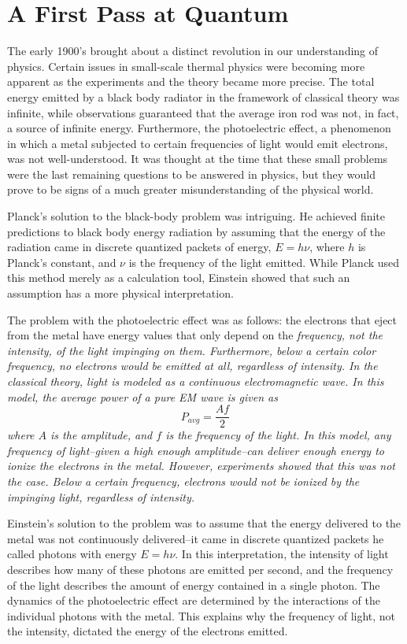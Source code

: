 \section{A First Pass at Quantum}
The early 1900's brought about a distinct revolution in our understanding of
physics. Certain issues in small-scale thermal physics were becoming more
apparent as the experiments and the theory became more precise.  The total
energy emitted by a black body radiator in the framework of classical theory was
infinite, while observations guaranteed that the average iron rod was not, in
fact, a source of infinite energy. Furthermore, the photoelectric effect, a
phenomenon in which a metal subjected to certain frequencies of light would emit
electrons, was not well-understood. It was thought at the time that these small
problems were the last remaining questions to be answered in physics, but they
would prove to be signs of a much greater misunderstanding of the physical
world.

Planck's solution to the black-body problem was intriguing. He achieved finite
predictions to black body energy radiation by assuming that the energy of the
radiation came in discrete quantized packets of energy, $E=h\nu$, where $h$ is
Planck's constant, and $\nu$ is the frequency of the light emitted. While Planck
used this method merely as a calculation tool, Einstein showed that
such an assumption has a more physical interpretation.

The problem with the photoelectric effect was as follows: the electrons that
eject from the metal have energy values that only depend on the \em
frequency\em, not the intensity, of the light impinging on them. Furthermore,
below a certain color frequency, no electrons would be emitted at all,
regardless of intensity. In the classical theory, light is modeled as a
continuous electromagnetic wave. In this model, the average power of a pure
EM wave is given as
\[
    P_{avg} = \frac{Af}{2}
\]
where $A$ is the amplitude, and $f$ is the frequency of the light. In this
model, any frequency of light--given a high enough amplitude--can deliver enough
energy to ionize the electrons in the metal. However, experiments showed that
this was not the case. Below a certain frequency, electrons would not be ionized
by the impinging light, regardless of intensity.

Einstein's solution to the problem was to assume that the energy delivered to
the metal was not continuously delivered--it came in discrete quantized packets
he called photons with energy $E = h\nu$. In this interpretation, the intensity
of light describes how many of these photons are emitted per second, and the
frequency of the light describes the amount of energy contained in a single
photon. The dynamics of the photoelectric effect are determined by the
interactions of the individual photons with the metal. This explains why the
frequency of light, not the intensity, dictated the energy of the electrons
emitted.

